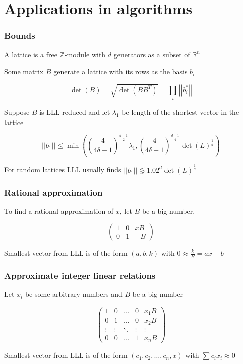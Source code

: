 \documentclass{beamer}
\newcommand{\vabs}[1]{\left|\left|#1\right|\right|}
\begin{document}
\section{Applications in algorithms}

\begin{frame}
    \frametitle{Bounds}
    A lattice is a free $\mathbb Z$-module with $d$ generators as a subset of $\mathbb R^n$

    Some matrix $B$ generate a lattice with its rows as the basis $b_i$

    $$\det(B)=\sqrt{\det\left(BB^T\right)}=\prod_i\vabs{b_i^*}$$\pause

    Suppose $B$ is LLL-reduced and let $\lambda_1$ be length of the shortest vector in the lattice

    $$\vabs{b_1}\leq\min\left(\left(\frac4{4\delta-1}\right)^{\frac{d-1}2}\lambda_1,\left(\frac4{4\delta-1}\right)^{\frac{d-1}4}\det(L)^{\frac1d}\right)$$\pause

    For random lattices LLL usually finds $\vabs{b_1}\lessapprox1.02^d\det(L)^{\frac1d}$
\end{frame}

\begin{frame}
    \frametitle{Rational approximation}
    To find a rational approximation of $x$, let $B$ be a big number. 

    $$\begin{pmatrix}1&0&xB\\0&1&-B\end{pmatrix}$$

    Smallest vector from LLL is of the form $(a,b,k)$ with $0\approx\frac kB=ax-b$
\end{frame}

\begin{frame}
    \frametitle{Approximate integer linear relations}
    Let $x_i$ be some arbitrary numbers and $B$ be a big number

    $$\begin{pmatrix}1&0&\dots&0&x_1B\\0&1&\dots&0&x_2B\\\vdots&\vdots&\ddots&\vdots&\vdots\\0&0&\dots&1&x_nB\end{pmatrix}$$

    Smallest vector from LLL is of the form $\left(c_1,c_2,\dots,c_n,x\right)$ with $\sum c_ix_i\approx0$
\end{frame}
\end{document}
